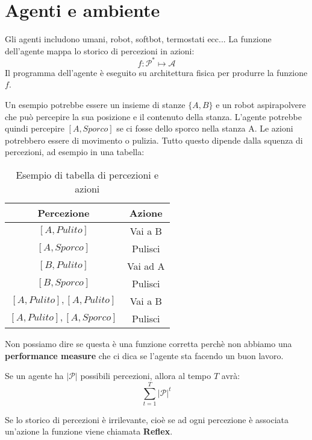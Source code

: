 \documentclass[a4paper]{article}
\begin{document}
\section{Agenti e ambiente}
Gli agenti includono umani, robot, softbot, termostati ecc... La funzione dell'agente
mappa lo storico di percezioni in azioni:
\[
  f: \mathcal{P}^* \mapsto \mathcal{A}
\] 
Il programma dell'agente è eseguito su architettura fisica per produrre la funzione \( f \).
\begin{example}
  Un esempio potrebbe essere un insieme di stanze \( \{A, B\}  \) e un robot aspirapolvere che può
  percepire la sua posizione e il contenuto della stanza. L'agente potrebbe quindi percepire
  \( [A, Sporco] \) se ci fosse dello sporco nella stanza A. Le azioni potrebbero essere
  di movimento o pulizia. Tutto questo dipende dalla squenza di percezioni, ad esempio 
  in una tabella:
  \begin{table}[H]
    \centering
    \begin{tabular}{|c|c|}
      \hline
      Percezione & Azione \\
      \hline
      \( [A, Pulito] \) & Vai a B \\
      \( [A, Sporco] \) & Pulisci \\
      \( [B, Pulito] \) & Vai ad A \\
      \( [B, Sporco] \) & Pulisci \\
      \( [A, Pulito], [A, Pulito] \) & Vai a B \\
      \( [A, Pulito], [A, Sporco] \) & Pulisci \\
      \hline
    \end{tabular}
    \caption{Esempio di tabella di percezioni e azioni}
  \end{table}
  \noindent
  Non possiamo dire se questa è una funzione corretta perchè non abbiamo una
  \textbf{performance measure} che ci dica se l'agente sta facendo un buon lavoro.
\end{example}

\begin{definition}
  Se un agente ha \( \left| \mathcal{P} \right|  \) possibili percezioni, allora al tempo
  \( T \) avrà:
  \[
    \sum_{t=1}^{T} \left| \mathcal{P} \right|^t
  \] 
\end{definition}
\noindent
Se lo storico di percezioni è irrilevante, cioè se ad ogni percezione è associata un'azione
la funzione viene chiamata \textbf{Reflex}.
\end{document}
